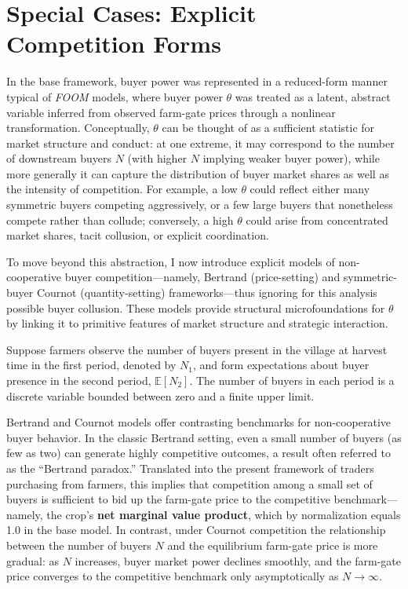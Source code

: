 \section{Special Cases: Explicit Competition Forms}\label{Section: Special Cases: Explicit Competition Forms}
\noindent In the base framework, buyer power was represented in a reduced-form manner typical of \textit{FOOM} models, where buyer power $\theta$ was treated as a latent, abstract variable inferred from observed farm-gate prices through a nonlinear transformation. Conceptually, $\theta$ can be thought of as a sufficient statistic for market structure and conduct: at one extreme, it may correspond to the number of downstream buyers $N$ (with higher $N$ implying weaker buyer power), while more generally it can capture the distribution of buyer market shares as well as the intensity of competition. For example, a low $\theta$ could reflect either many symmetric buyers competing aggressively, or a few large buyers that nonetheless compete rather than collude; conversely, a high $\theta$ could arise from concentrated market shares, tacit collusion, or explicit coordination. 

To move beyond this abstraction, I now introduce explicit models of non-cooperative buyer competition---namely, Bertrand (price-setting) and symmetric-buyer Cournot (quantity-setting) frameworks---thus ignoring for this analysis possible buyer collusion. These models provide structural microfoundations for $\theta$ by linking it to primitive features of market structure and strategic interaction.


Suppose farmers observe the number of buyers present in the village at harvest time in the first period, denoted by $N_1$, and form expectations about buyer presence in the second period, $\mathbb{E}[N_2]$. The number of buyers in each period is a discrete variable bounded between zero and a finite upper limit.

Bertrand and Cournot models offer contrasting benchmarks for non-cooperative buyer behavior. In the classic Bertrand setting, even a small number of buyers (as few as two) can generate highly competitive outcomes, a result often referred to as the ``Bertrand paradox.'' Translated into the present framework of traders purchasing from farmers, this implies that competition among a small set of buyers is sufficient to bid up the farm-gate price to the competitive benchmark---namely, the crop's \textbf{net marginal value product}, which by normalization equals 1.0 in the base model. In contrast, under Cournot competition the relationship between the number of buyers $N$ and the equilibrium farm-gate price is more gradual: as $N$ increases, buyer market power declines smoothly, and the farm-gate price converges to the competitive benchmark only asymptotically as $N \to \infty$.


